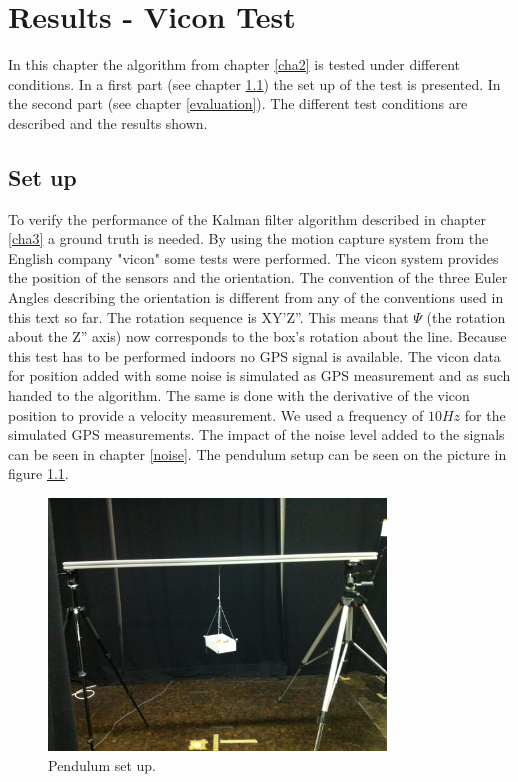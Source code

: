\chapter{Results - Vicon Test}\label{cha4}
In this chapter the algorithm from chapter \ref{cha2} is tested under different conditions. In a first part (see chapter \ref{setup}) the set up of the test is presented. In the second part (see chapter \ref{evaluation}). The different test conditions are described and the results shown.
\section{Set up}\label{setup}
To verify the performance of the Kalman filter algorithm described in chapter \ref{cha3} a ground truth is needed.  By using the motion capture system from the English company "vicon" some tests were performed. The vicon system provides the position of the sensors and the orientation. The convention of the three Euler Angles describing the orientation is different from any of the conventions used in this text so far. The rotation sequence is XY'Z''. This means that $\Psi$ (the rotation about the Z'' axis) now corresponds to the box's rotation about the line. Because this test has to be performed indoors no GPS signal is available. The vicon data for position added with some noise is simulated as GPS measurement and as such handed to the algorithm. The same is done with the derivative of the vicon position to provide a velocity measurement. We used a frequency of $10 Hz$ for the simulated GPS measurements. The impact of the noise level added to the signals can be seen in chapter \ref{noise}.
The pendulum setup can be seen on the picture in figure \ref{pend_setup}. 
\begin{figure}[h]
\centering
\includegraphics[width=0.8\textwidth]{vicon_bilder/IMG_0137.JPG}
\caption{Pendulum set up.}
\label{pend_setup}
\end{figure}
